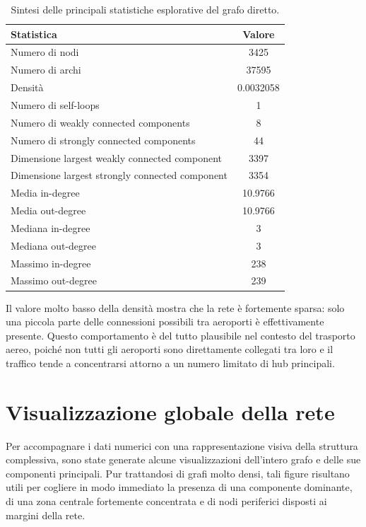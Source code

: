 \begin{table}[H]
\centering
\caption{Sintesi delle principali statistiche esplorative del grafo diretto.}
\label{tab:exploratory_summary}
\begin{tabular}{lc}
\toprule
\textbf{Statistica} & \textbf{Valore} \\
\midrule
Numero di nodi & 3425 \\
Numero di archi & 37595 \\
Densità & 0.0032058 \\
Numero di self-loops & 1 \\
Numero di weakly connected components & 8 \\
Numero di strongly connected components & 44 \\
Dimensione largest weakly connected component & 3397 \\
Dimensione largest strongly connected component & 3354 \\
Media in-degree & 10.9766 \\
Media out-degree & 10.9766 \\
Mediana in-degree & 3 \\
Mediana out-degree & 3 \\
Massimo in-degree & 238 \\
Massimo out-degree & 239 \\
\bottomrule
\end{tabular}
\end{table}

Il valore molto basso della densità mostra che la rete è fortemente sparsa: solo una piccola parte delle connessioni possibili tra aeroporti è effettivamente presente. Questo comportamento è del tutto plausibile nel contesto del trasporto aereo, poiché non tutti gli aeroporti sono direttamente collegati tra loro e il traffico tende a concentrarsi attorno a un numero limitato di hub principali.

\section{Visualizzazione globale della rete}

Per accompagnare i dati numerici con una rappresentazione visiva della struttura complessiva, sono state generate alcune visualizzazioni dell’intero grafo e delle sue componenti principali. Pur trattandosi di grafi molto densi, tali figure risultano utili per cogliere in modo immediato la presenza di una componente dominante, di una zona centrale fortemente concentrata e di nodi periferici disposti ai margini della rete.

